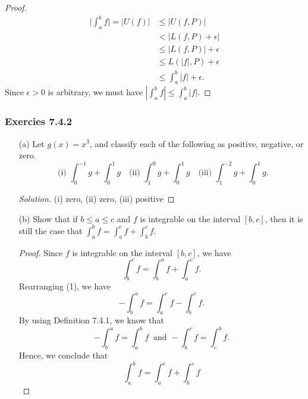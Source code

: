 \begin{enumerate}
\begin{proof}
		\begin{align*}
		    \Big| \int_{ a }^{ b } f  \Big| = | U(f)  |   
											&\leq | U(f,P)  | \\
											&< \Big| L(f,P) + \epsilon  \Big| \\  
											&\leq | L(f,P)  | + \epsilon \\
											&\leq L(| f | , P) + \epsilon \\
											&\leq \int_{ a }^{ b } | f | + \epsilon. 
		\end{align*}
		Since \( \epsilon > 0  \) is arbitrary, we must have \( | \int_{ a }^{ b } f  |  \leq \int_{ a }^{ b } | f |   \). 
		\end{proof}
\end{enumerate}


\subsubsection{Exercies 7.4.2}  
\begin{enumerate}
    \item[(a)] Let \( g(x) = x^{3}  \), and classify each of the following as positive, negative, or zero.
		\[  \text{ (i) } \int_{ 0 }^{ -1 } g + \int_{ 0 }^{ 1 } g \ \ \   \text{ (ii) } \int_{ 1 }^{ 0 } g + \int_{ 0 }^{ 1 }  g \ \ \ \text{ (iii) } \int_{ 1 }^{ -2 } g + \int_{ 0 }^{ 1 } g.  \]
		\begin{proof}[Solution]
			(i) zero, (ii) zero, (iii) positive 
		\end{proof}
	\item[(b)] Show that if \( b \leq a \leq c  \) and \( f  \) is integrable on the interval \( [b,c]  \), then it is still the case that \( \int_{ a }^{ b } f = \int_{ a }^{ c } f + \int_{ b }^{ c } f  \).
		\begin{proof}
			Since \( f  \) is integrable on the interval \( [b,c]  \), we have 
			\[  \int_{ b }^{ c } f   = \int_{ b }^{ a } f  + \int_{ a }^{ c } f. \tag{1} \]
			Rearranging (1), we have 
			\[  - \int_{ b }^{ a } f = \int_{ a }^{ c } f  - \int_{ b }^{ c } f.\] By using Definition 7.4.1, we know that 
			\[  - \int_{ b }^{ a } f = \int_{ a }^{ b } f  \ \text{ and }  -\int_{ b }^{ c } f = \int_{ c }^{ b } f.  \]
			Hence, we conclude that 
			\[ \int_{ a }^{ b } f = \int_{ a }^{ c } f + \int_{ b }^{ c } f  \]

		\end{proof}
\end{enumerate}


